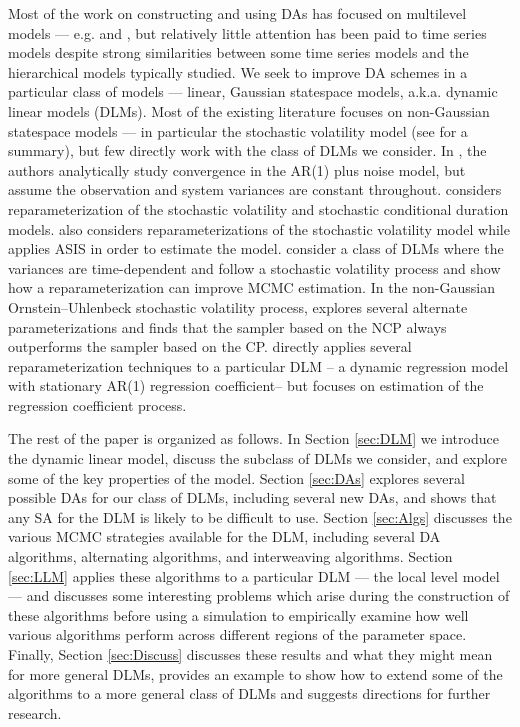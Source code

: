 \documentclass{article}
\begin{document}
Most of the work on constructing and using DAs has focused on multilevel models --- e.g.  and , but relatively little attention has been paid to time series models despite strong similarities between some time series models and the hierarchical models typically studied. We seek to improve DA schemes in a particular class of models --- linear, Gaussian statespace models, a.k.a. dynamic linear models (DLMs). Most of the existing literature focuses on non-Gaussian statespace models --- in particular the stochastic volatility model (see  for a summary), but few directly work with the class of DLMs we consider. In , the authors analytically study convergence in the AR(1) plus noise model, but assume the observation and system variances are constant throughout.  considers reparameterization of the stochastic volatility and stochastic conditional duration models.  also considers reparameterizations of the stochastic volatility model while  applies ASIS in order to estimate the model.  consider a class of DLMs where the variances are time-dependent and follow a stochastic volatility process and show how a reparameterization can improve MCMC estimation. In the non-Gaussian Ornstein--Uhlenbeck stochastic volatility process,  explores several alternate parameterizations and finds that the sampler based on the NCP always outperforms the sampler based on the CP.  directly applies several reparameterization techniques to a particular DLM -- a dynamic regression model with stationary AR(1) regression coefficient-- but focuses on estimation of the regression coefficient process.

The rest of the paper is organized as follows. In Section \ref{sec:DLM} we introduce the dynamic linear model, discuss the subclass of DLMs we consider, and explore some of the key properties of the model. Section \ref{sec:DAs} explores several possible DAs for our class of DLMs, including several new DAs, and shows that any SA for the DLM is likely to be difficult to use. Section \ref{sec:Algs} discusses the various MCMC strategies available for the DLM, including several DA algorithms, alternating algorithms, and interweaving algorithms. Section \ref{sec:LLM} applies these algorithms to a particular DLM --- the local level model --- and discusses some interesting problems which arise during the construction of these algorithms before using a simulation to empirically examine how well various algorithms perform across different regions of the parameter space. Finally, Section \ref{sec:Discuss} discusses these results and what they might mean for more general DLMs, provides an example to show how to extend some of the algorithms to a more general class of DLMs and suggests directions for further research.
\end{document}
